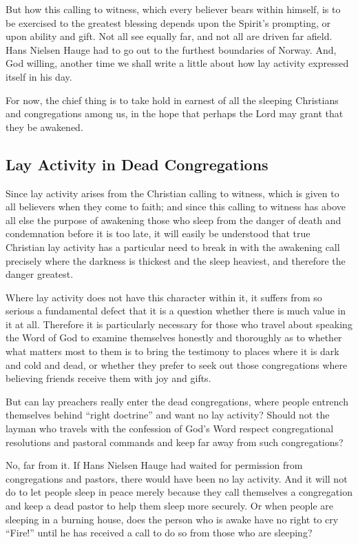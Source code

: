 But how this calling to witness, which every believer bears within himself, is to be exercised to the greatest blessing depends upon the Spirit’s prompting, or upon ability and gift. Not all see equally far, and not all are driven far afield. Hans Nielsen Hauge had to go out to the furthest boundaries of Norway. And, God willing, another time we shall write a little about how lay activity expressed itself in his day.

For now, the chief thing is to take hold in earnest of all the sleeping Christians and congregations among us, in the hope that perhaps the Lord may grant that they be awakened.

\subsection{Lay Activity in Dead Congregations}

Since lay activity arises from the Christian calling to witness, which is given to all believers when they come to faith; and since this calling to witness has above all else the purpose of awakening those who sleep from the danger of death and condemnation before it is too late, it will easily be understood that true Christian lay activity has a particular need to break in with the awakening call precisely where the darkness is thickest and the sleep heaviest, and therefore the danger greatest.

Where lay activity does not have this character within it, it suffers from so serious a fundamental defect that it is a question whether there is much value in it at all. Therefore it is particularly necessary for those who travel about speaking the Word of God to examine themselves honestly and thoroughly as to whether what matters most to them is to bring the testimony to places where it is dark and cold and dead, or whether they prefer to seek out those congregations where believing friends receive them with joy and gifts.

But can lay preachers really enter the dead congregations, where people entrench themselves behind “right doctrine” and want no lay activity? Should not the layman who travels with the confession of God’s Word respect congregational resolutions and pastoral commands and keep far away from such congregations?

No, far from it. If Hans Nielsen Hauge had waited for permission from congregations and pastors, there would have been no lay activity. And it will not do to let people sleep in peace merely because they call themselves a congregation and keep a dead pastor to help them sleep more securely. Or when people are sleeping in a burning house, does the person who is awake have no right to cry “Fire!” until he has received a call to do so from those who are sleeping?

